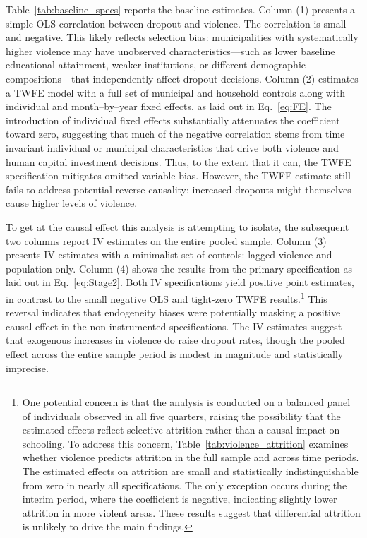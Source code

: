 \documentclass[12pt,letter,english,intoc,bibliography=totoc,index=totoc,BCOR10mm,captions=tableheading,nottitlepage,fleqn]{article}
\theoremstyle{break}
\begin{document}
Table~\ref{tab:baseline_specs} reports the baseline estimates. Column (1) presents a simple OLS correlation between dropout and violence. The correlation is small and negative. This likely reflects selection bias: municipalities with systematically higher violence may have unobserved characteristics---such as lower baseline educational attainment, weaker institutions, or different demographic compositions---that independently affect dropout decisions. Column (2) estimates a TWFE model with a full set of municipal and household controls along with individual and month--by--year fixed effects, as laid out in Eq.~\eqref{eq:FE}. The introduction of individual fixed effects substantially attenuates the coefficient toward zero, suggesting that much of the negative correlation stems from time invariant individual or municipal characteristics that drive both violence and human capital investment decisions. Thus, to the extent that it can, the TWFE specification mitigates omitted variable bias. However, the TWFE estimate still fails to address potential reverse causality: increased dropouts might themselves cause higher levels of violence. 

To get at the causal effect this analysis is attempting to isolate, the subsequent two columns report IV estimates on the entire pooled sample. Column (3) presents IV estimates with a minimalist set of controls: lagged violence and population only. Column (4) shows the results from the primary specification as laid out in Eq.~\eqref{eq:Stage2}. Both IV specifications yield positive point estimates, in contrast to the small negative OLS and tight-zero TWFE results.\footnote{One potential concern is that the analysis is conducted on a balanced panel of individuals observed in all five quarters, raising the possibility that the estimated effects reflect selective attrition rather than a causal impact on schooling. To address this concern, Table~\ref{tab:violence_attrition} examines whether violence predicts attrition in the full sample and across time periods. The estimated effects on attrition are small and statistically indistinguishable from zero in nearly all specifications. The only exception occurs during the interim period, where the coefficient is negative, indicating slightly lower attrition in more violent areas. These results suggest that differential attrition is unlikely to drive the main findings.} This reversal indicates that endogeneity biases were potentially masking a positive causal effect in the non-instrumented specifications. The IV estimates suggest that exogenous increases in violence do raise dropout rates, though the pooled effect across the entire sample period is modest in magnitude and statistically imprecise.
\end{document}
